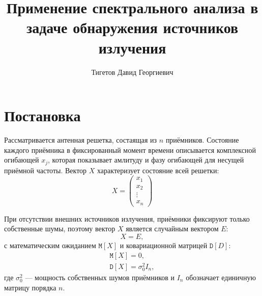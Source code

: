 \documentclass[a4paper,12pt]{article}
\newcommand{\expectation}[1]{\mathtt{M} \left[ #1 \right]}
\newcommand{\variance}[1]{\mathtt{D} \left[ #1 \right]}
\begin{document}
    \title{Применение спектрального анализа в задаче обнаружения источников излучения}
    \author{Тигетов Давид Георгиевич}
    \maketitle


    \section{Постановка}

    Рассматривается антенная решетка, состаящая из $n$ приёмников. Состояние каждого приёмника в фиксированный момент времени описывается комплексной огибающей $x_j$,
    которая показывает амлитуду и фазу огибающей для несущей приёмной частоты. Вектор $X$ характеризует состояние всей решетки:
    \[
        X
        = \begin{pmatrix}
              x_1    \\
              x_2    \\
              \vdots \\
              x_n
        \end{pmatrix}
    \]

    При отсутствии внешних источников излучения, приёмники фиксируют только собственные шумы, поэтому вектор $X$ является случайным вектором $E$:
    \[
        X = E ,
    \]
    с математическим ожиданием $\expectation{X}$ и ковариационной матрицей $\variance{D}$:
    \begin{gather*}
        \expectation{X} = 0 , \\
        \variance{X} = \sigma_0^2 I_n,
    \end{gather*}
    где $\sigma_0^2$ --- мощность собственных шумов приёмников и $I_n$ обозначает единичную матрицу порядка $n$.
\end{document}
